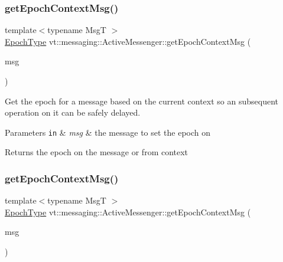 \subsubsection{\texorpdfstring{get\+Epoch\+Context\+Msg()}{getEpochContextMsg()}\hspace{0.1cm}{\footnotesize\ttfamily [1/2]}}
{\footnotesize\ttfamily template$<$typename MsgT $>$ \\
\hyperlink{namespacevt_a985a5adf291c34a3ca263b3378388236}{Epoch\+Type} vt\+::messaging\+::\+Active\+Messenger\+::get\+Epoch\+Context\+Msg (\begin{DoxyParamCaption}\item[{MsgT $\ast$}]{msg }\end{DoxyParamCaption})\hspace{0.3cm}{\ttfamily [inline]}}



Get the epoch for a message based on the current context so an subsequent operation on it can be safely delayed. 


\begin{DoxyParams}[1]{Parameters}
\mbox{\tt in}  & {\em msg} & the message to set the epoch on\\
\hline
\end{DoxyParams}
\begin{DoxyReturn}{Returns}
the epoch on the message or from context 
\end{DoxyReturn}
\mbox{\label{structvt_1_1messaging_1_1_active_messenger_a66c64223357aa92f45a4a4042bd63a5f}} 
\subsubsection{\texorpdfstring{get\+Epoch\+Context\+Msg()}{getEpochContextMsg()}\hspace{0.1cm}{\footnotesize\ttfamily [2/2]}}
{\footnotesize\ttfamily template$<$typename MsgT $>$ \\
\hyperlink{namespacevt_a985a5adf291c34a3ca263b3378388236}{Epoch\+Type} vt\+::messaging\+::\+Active\+Messenger\+::get\+Epoch\+Context\+Msg (\begin{DoxyParamCaption}\item[{\hyperlink{structvt_1_1messaging_1_1_msg_shared_ptr}{Msg\+Shared\+Ptr}$<$ MsgT $>$ const \&}]{msg }\end{DoxyParamCaption})\hspace{0.3cm}{\ttfamily [inline]}}



